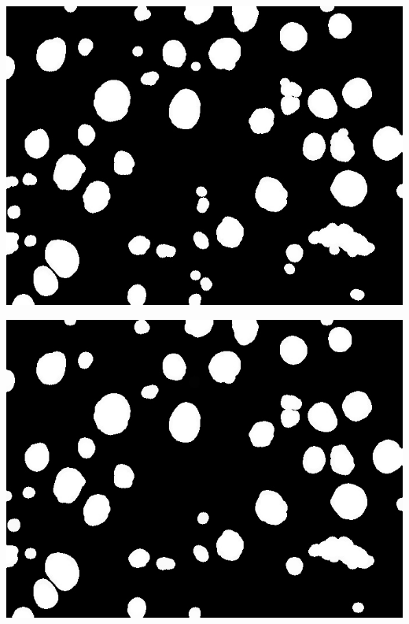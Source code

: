 \documentclass[a4paper]{article}
\begin{document}
\noindent
\begin{minipage}{0.24\textwidth}
    \centering
    \includegraphics[width=\textwidth]{../code/task1/output/kernel_size_17.jpg}
\end{minipage}
\hfill
\begin{minipage}{0.24\textwidth}
    \centering
    \includegraphics[width=\textwidth]{../code/task1/output/kernel_size_19.jpg}
\end{minipage}
\hfill
\end{document}
